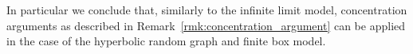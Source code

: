 In particular we conclude that, similarly to the infinite limit model, concentration arguments as described in Remark~\ref{rmk:concentration_argument} can be applied in the case of the hyperbolic random graph and finite box model.


